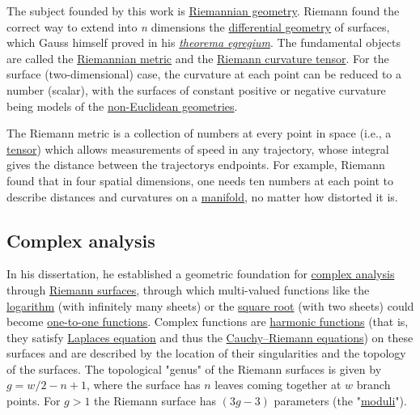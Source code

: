 The subject founded by this work is \href{https://en.wikipedia.org/wiki/Riemannian_geometry}{Riemannian geometry}. Riemann found the correct way to extend into \emph{n} dimensions the \href{https://en.wikipedia.org/wiki/Differential_geometry}{differential geometry} of surfaces, which Gauss himself proved in his \emph{\href{https://en.wikipedia.org/wiki/Theorema_egregium}{theorema egregium}}. The fundamental objects are called the \href{https://en.wikipedia.org/wiki/Riemannian_metric}{Riemannian metric} and the \href{https://en.wikipedia.org/wiki/Riemann_curvature_tensor}{Riemann curvature tensor}. For the surface (two-dimensional) case, the curvature at each point can be reduced to a number (scalar), with the surfaces of constant positive or negative curvature being models of the \href{https://en.wikipedia.org/wiki/Non-Euclidean_geometry}{non-Euclidean geometries}.

The Riemann metric is a collection of numbers at every point in space (i.e., a \href{https://en.wikipedia.org/wiki/Tensor}{tensor}) which allows measurements of speed in any trajectory, whose integral gives the distance between the trajectory\textquotesingle s endpoints. For example, Riemann found that in four spatial dimensions, one needs ten numbers at each point to describe distances and curvatures on a \href{https://en.wikipedia.org/wiki/Manifold}{manifold}, no matter how distorted it is.


\subsection{Complex analysis}\label{Complex_analysis}

In his dissertation, he established a geometric foundation for \href{https://en.wikipedia.org/wiki/Complex_analysis}{complex analysis} through \href{https://en.wikipedia.org/wiki/Riemann_surface}{Riemann surfaces}, through which multi-valued functions like the \href{https://en.wikipedia.org/wiki/Logarithm}{logarithm} (with infinitely many sheets) or the \href{https://en.wikipedia.org/wiki/Square_root}{square root} (with two sheets) could become \href{https://en.wikipedia.org/wiki/One-to-one_function}{one-to-one functions}. Complex functions are \href{https://en.wikipedia.org/wiki/Harmonic_functions}{harmonic functions} (that is, they satisfy \href{https://en.wikipedia.org/wiki/Laplace's_equation}{Laplace\textquotesingle s equation} and thus the \href{https://en.wikipedia.org/wiki/Cauchy–Riemann_equations}{Cauchy--Riemann equations}) on these surfaces and are described by the location of their singularities and the topology of the surfaces. The topological "genus" of the Riemann surfaces is given by {{\(g = w/2 - n + 1\)}{}}, where the surface has {{\(n\)}{}} leaves coming together at {{\(w\)}{}} branch points. For {{\(g > 1\)}{}} the Riemann surface has {{\((3g - 3)\)}{}} parameters (the "\href{https://en.wikipedia.org/wiki/Moduli_of_algebraic_curves}{moduli}").

